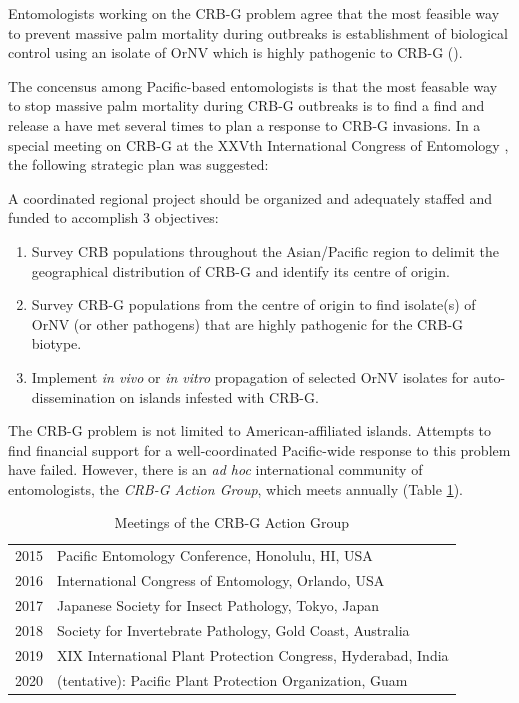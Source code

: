 \documentclass[12pt,letterpaper,english,bibliography=totocnumbered, abstract=on]{scrartcl}
\begin{document}
Entomologists working on the CRB-G problem agree that the most feasible
way to prevent massive palm mortality during outbreaks is establishment
of biological control using an isolate of OrNV which is highly pathogenic
to CRB-G (\cite{jackson_need_2015,vaqalo_pest_2015,secretariat_of_the_pacific_community_pest_2017}).

The concensus among Pacific-based entomologists is that the most feasable
way to stop massive palm mortality during CRB-G outbreaks is to find
a find and release a have met several times to plan a response to
CRB-G invasions. In a special meeting on CRB-G at the XXVth International
Congress of Entomology 
, the following strategic
plan was suggested:

A coordinated regional project should be organized and adequately
staffed and funded to accomplish 3 objectives:

\begin{enumerate}
	
\item Survey CRB populations throughout the Asian/Pacific region to delimit
the geographical distribution of CRB-G and identify its centre of
origin.

\item Survey CRB-G populations from the centre of origin to find isolate(s)
of OrNV (or other pathogens) that are highly pathogenic for the CRB-G
biotype.

\item Implement \emph{in vivo} or \emph{in vitro} propagation of selected
OrNV isolates for auto-dissemination on islands infested with CRB-G.

\end{enumerate}

The CRB-G problem is not limited to American-affiliated islands. Attempts to find financial support for a well-coordinated Pacific-wide response to this problem have failed. However, there is an \textit{ad hoc} international community of entomologists, the \textit{CRB-G Action Group}, which meets annually (Table \ref{table meetings}).

\begin{table}[H]
	\label{table meetings}
	\centering
	\caption{Meetings of the CRB-G Action Group}
	\begin{tabular}{ll}
		\hline 
		2015 & Pacific Entomology Conference, Honolulu, HI, USA \\ 
		2016 & International Congress of Entomology, Orlando, USA \\
		2017 & Japanese Society for Insect Pathology, Tokyo, Japan \\
		2018 & Society for Invertebrate Pathology, Gold Coast, Australia \\
		2019 & XIX International Plant Protection Congress, Hyderabad, India \\
		2020 & (tentative): Pacific Plant Protection Organization, Guam \\ 
		\hline
\end{tabular}
\end{table}
\end{document}
